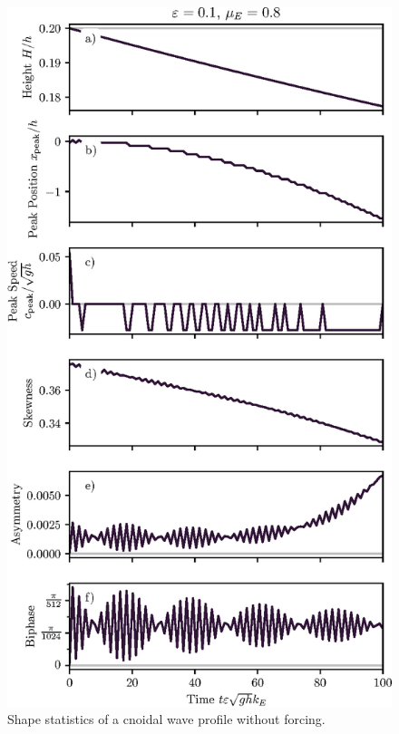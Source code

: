 \documentclass{jfm}
\begin{document}
\begin{figure}
  \centering
  \includegraphics{LongStatistics-Cnoidal.eps}
  \caption{
    Shape statistics of a cnoidal wave profile without forcing.
  }
\end{figure}
\end{document}
